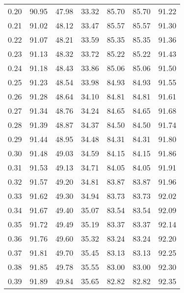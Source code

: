 \begin{tabular}{|c|c|c|c|c|c|c|}
      0.20 &     90.95 &     47.98 &      33.32 &   85.70 &      85.70 &         91.22 \\
      0.21 &     91.02 &     48.12 &      33.47 &   85.57 &      85.57 &         91.30 \\
      0.22 &     91.07 &     48.21 &      33.59 &   85.35 &      85.35 &         91.36 \\
      0.23 &     91.13 &     48.32 &      33.72 &   85.22 &      85.22 &         91.43 \\
      0.24 &     91.18 &     48.43 &      33.86 &   85.06 &      85.06 &         91.50 \\
      0.25 &     91.23 &     48.54 &      33.98 &   84.93 &      84.93 &         91.55 \\
      0.26 &     91.28 &     48.64 &      34.10 &   84.81 &      84.81 &         91.61 \\
      0.27 &     91.34 &     48.76 &      34.24 &   84.65 &      84.65 &         91.68 \\
      0.28 &     91.39 &     48.87 &      34.37 &   84.50 &      84.50 &         91.74 \\
      0.29 &     91.44 &     48.95 &      34.48 &   84.31 &      84.31 &         91.80 \\
      0.30 &     91.48 &     49.03 &      34.59 &   84.15 &      84.15 &         91.86 \\
      0.31 &     91.53 &     49.13 &      34.71 &   84.05 &      84.05 &         91.91 \\
      0.32 &     91.57 &     49.20 &      34.81 &   83.87 &      83.87 &         91.96 \\
      0.33 &     91.62 &     49.30 &      34.94 &   83.73 &      83.73 &         92.02 \\
      0.34 &     91.67 &     49.40 &      35.07 &   83.54 &      83.54 &         92.09 \\
      0.35 &     91.72 &     49.49 &      35.19 &   83.37 &      83.37 &         92.14 \\
      0.36 &     91.76 &     49.60 &      35.32 &   83.24 &      83.24 &         92.20 \\
      0.37 &     91.81 &     49.70 &      35.45 &   83.13 &      83.13 &         92.25 \\
      0.38 &     91.85 &     49.78 &      35.55 &   83.00 &      83.00 &         92.30 \\
      0.39 &     91.89 &     49.84 &      35.65 &   82.82 &      82.82 &         92.35 \\

\end{tabular}

